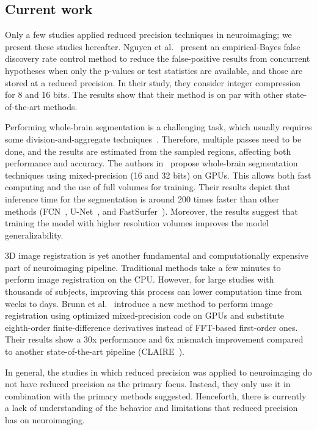 \subsection{Current work}
Only a few studies applied reduced precision techniques in neuroimaging; we present these studies hereafter.
Nguyen et al.~\cite{Nguyen2018-lo} present an empirical-Bayes false discovery rate
control method to reduce the false-positive results from concurrent hypotheses when
only the p-values or test statistics are available, and those are stored at a reduced precision. 
In their study, they consider integer compression for 8 and 16 bits.
The results show that their method is on par with other state-of-the-art methods.
		
Performing whole-brain segmentation is a challenging task, which usually requires
some division-and-aggregate techniques~\cite{Li2021-rv}.
Therefore, multiple passes need to be done, and the results are estimated from the sampled regions, affecting both performance and accuracy.
The authors in~\cite{Li2021-rv} propose whole-brain segmentation techniques using mixed-precision (16 and 32 bits) on GPUs.
This allows both fast computing and the use of full volumes for training. 
Their results depict that inference time for the segmentation is around 200 times
faster than other methods (FCN~\cite{Long2015-qr}, U-Net~\cite{Ronneberger2015-wy}, and FastSurfer~\cite{Henschel2020-vq}).
Moreover, the results suggest that training the model with higher resolution volumes improves the model generalizability.
		
3D image registration is yet another fundamental and computationally expensive part
of neuroimaging pipeline.
Traditional methods take a few minutes to perform image registration on the CPU.
However, for large studies with thousands of subjects, improving this process can lower computation time from weeks to days.
Brunn et al.~\cite{Brunn2021-zj} introduce a new method to perform image registration
using optimized mixed-precision code on GPUs and substitute eighth-order
finite-difference derivatives instead of FFT-based first-order ones.
Their results show a 30x performance and 6x mismatch improvement compared to
another state-of-the-art pipeline (CLAIRE~\cite{Mang2019-nu}).
		
In general, the studies in which reduced precision was applied to neuroimaging do not have reduced precision as the primary focus.
Instead, they only use it in combination with the primary methods suggested.
Henceforth, there is currently a lack of understanding of the behavior and limitations that reduced precision has on neuroimaging.
	
